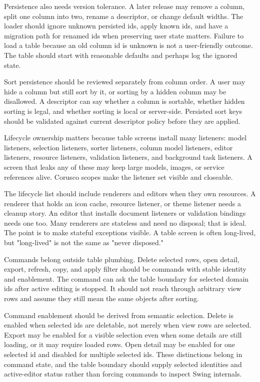 Persistence also needs version tolerance. A later release may remove a column, split one column into two, rename a descriptor, or change default widths. The loader should ignore unknown persisted ids, apply known ids, and have a migration path for renamed ids when preserving user state matters. Failure to load a table because an old column id is unknown is not a user-friendly outcome. The table should start with reasonable defaults and perhaps log the ignored state.

Sort persistence should be reviewed separately from column order. A user may hide a column but still sort by it, or sorting by a hidden column may be disallowed. A descriptor can say whether a column is sortable, whether hidden sorting is legal, and whether sorting is local or server-side. Persisted sort keys should be validated against current descriptor policy before they are applied.

Lifecycle ownership matters because table screens install many listeners: model listeners, selection listeners, sorter listeners, column model listeners, editor listeners, resource listeners, validation listeners, and background task listeners. A screen that leaks any of these may keep large models, images, or service references alive. Corusco scopes make the listener set visible and closeable.

The lifecycle list should include renderers and editors when they own resources. A renderer that holds an icon cache, resource listener, or theme listener needs a cleanup story. An editor that installs document listeners or validation bindings needs one too. Many renderers are stateless and need no disposal; that is ideal. The point is to make stateful exceptions visible. A table screen is often long-lived, but "long-lived" is not the same as "never disposed."

Commands belong outside table plumbing. Delete selected rows, open detail, export, refresh, copy, and apply filter should be commands with stable identity and enablement. The command can ask the table boundary for selected domain ids after active editing is stopped. It should not reach through arbitrary view rows and assume they still mean the same objects after sorting.

Command enablement should be derived from semantic selection. Delete is enabled when selected ids are deletable, not merely when view rows are selected. Export may be enabled for a visible selection even when some details are still loading, or it may require loaded rows. Open detail may be enabled for one selected id and disabled for multiple selected ids. These distinctions belong in command state, and the table boundary should supply selected identities and active-editor status rather than forcing commands to inspect Swing internals.

